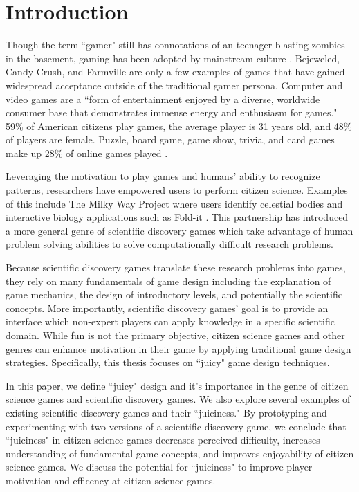 \chapter{Introduction}

Though the term ``gamer" still has connotations of an teenager blasting zombies in the basement, gaming has been adopted by mainstream culture \cite{sciencefriday2014}. Bejeweled, Candy Crush, and Farmville are only a few examples of games that have gained widespread acceptance outside of the traditional gamer persona. Computer and video games are a ``form of entertainment enjoyed by a diverse, worldwide consumer base that demonstrates immense energy and enthusiasm for games." \cite{softass} 59\% of American citizens play games, the average player is 31 years old, and 48\% of players are female. Puzzle, board game, game show, trivia, and card games make up 28\% of online games played \cite{softass}.

Leveraging the motivation to play games and humans' ability to recognize patterns, researchers have empowered users to perform citizen science. Examples of this include The Milky Way Project where users identify celestial bodies \cite{milkyway2014} and interactive biology applications such as Fold-it \cite{cooper2010challenge}. This partnership has introduced a more general genre of scientific discovery games which take advantage of human problem solving abilities to solve computationally difficult research problems. 

Because scientific discovery games translate these research problems into games, they rely on many fundamentals of game design including the explanation of game mechanics, the design of introductory levels, and potentially the scientific concepts. More importantly, scientific discovery games' goal is to provide an interface which non-expert players can apply knowledge in a specific scientific domain. \cite{cooper2010challenge} While fun is not the primary objective, citizen science games and other genres can enhance motivation in their game by applying traditional game design strategies. Specifically, this thesis focuses on ``juicy" game design techniques.

In this paper, we define ``juicy" design and it's importance in the genre of citizen science games and scientific discovery games. We also explore several examples of existing scientific discovery games and their ``juiciness." By prototyping and experimenting with two versions of a scientific discovery game, we conclude that ``juiciness" in citizen science games decreases perceived difficulty, increases understanding of fundamental game concepts, and improves enjoyability of citizen science games. We discuss the potential for ``juiciness" to improve player motivation and efficency at citizen science games.
